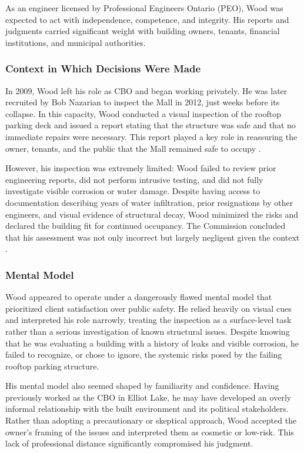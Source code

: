 \documentclass[12pt]{article}
\begin{document}
As an engineer licensed by Professional Engineers Ontario (PEO), Wood was expected to act with independence, competence, and integrity. His reports and judgments carried significant weight with building owners, tenants, financial institutions, and municipal authorities.

\subsubsection*{Context in Which Decisions Were Made}

In 2009, Wood left his role as CBO and began working privately. He was later recruited by Bob Nazarian to inspect the Mall in 2012, just weeks before its collapse. In this capacity, Wood conducted a visual inspection of the rooftop parking deck and issued a report stating that the structure was safe and that no immediate repairs were necessary. This report played a key role in reassuring the owner, tenants, and the public that the Mall remained safe to occupy \cite[p392-394]{AlgoLakeReport1}.

However, his inspection was extremely limited: Wood failed to review prior engineering reports, did not perform intrusive testing, and did not fully investigate visible corrosion or water damage. Despite having access to documentation describing years of water infiltration, prior resignations by other engineers, and visual evidence of structural decay, Wood minimized the risks and declared the building fit for continued occupancy. The Commission concluded that his assessment was not only incorrect but largely negligent given the context \cite[p393-394]{AlgoLakeReport1}.

\subsubsection*{Mental Model}

Wood appeared to operate under a dangerously flawed mental model that prioritized client satisfaction over public safety. He relied heavily on visual cues and interpreted his role narrowly, treating the inspection as a surface-level task rather than a serious investigation of known structural issues. Despite knowing that he was evaluating a building with a history of leaks and visible corrosion, he failed to recognize, or chose to ignore, the systemic risks posed by the failing rooftop parking structure.

His mental model also seemed shaped by familiarity and confidence. Having previously worked as the CBO in Elliot Lake, he may have developed an overly informal relationship with the built environment and its political stakeholders. Rather than adopting a precautionary or skeptical approach, Wood accepted the owner's framing of the issues and interpreted them as cosmetic or low-risk. This lack of professional distance significantly compromised his judgment.
\end{document}
